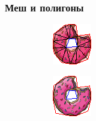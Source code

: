 \documentclass[10pt, unicode]{beamer}
\begin{document}
    \begin{frame}
        \frametitle{Меш и полигоны}
        \begin{figure}[H]
            \centering
            \begin{subfigure}[t]{.49\linewidth}
                \includegraphics[scale=1.5]{donutpixel_mesh.png}
            \end{subfigure}
            \begin{subfigure}[t]{.49\linewidth}
                \centering
                \includegraphics[scale=1.5]{donutpixel_approx_mid.png}
            \end{subfigure}
        \end{figure}
    \end{frame}
\end{document}
